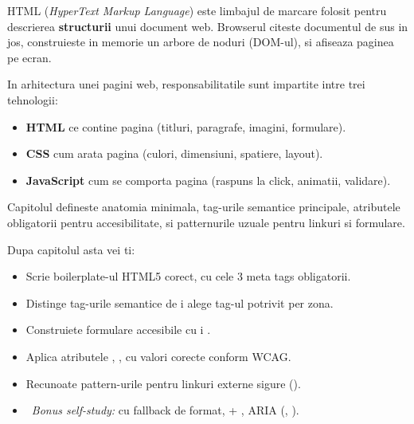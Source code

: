 \clearpage
{}
\setcounter{section}{0}
{}

HTML (\emph{HyperText Markup Language}) este limbajul de marcare folosit pentru descrierea \textbf{structurii} unui document web. Browserul citeste documentul de sus in jos, construieste in memorie un arbore de noduri (DOM-ul), si afiseaza paginea pe ecran.

In arhitectura unei pagini web, responsabilitatile sunt impartite intre trei tehnologii:

\begin{itemize}[itemsep=0pt]
  \item \textbf{HTML} \textendash{} ce contine pagina (titluri, paragrafe, imagini, formulare).
  \item \textbf{CSS} \textendash{} cum arata pagina (culori, dimensiuni, spatiere, layout).
  \item \textbf{JavaScript} \textendash{} cum se comporta pagina (raspuns la click, animatii, validare).
\end{itemize}

Capitolul defineste anatomia minimala, tag-urile semantice principale, atributele obligatorii pentru accesibilitate, si patternurile uzuale pentru linkuri si formulare.

\bigskip

\begin{outcomes}
Dupa capitolul asta vei ti:
\begin{itemize}[itemsep=1pt]
  \item Scrie boilerplate-ul HTML5 corect, cu cele 3 meta tags obligatorii.
  \item Distinge tag-urile semantice de  i alege tag-ul potrivit per zona.
  \item Construiete formulare accesibile cu  i .
  \item Aplica atributele , ,  cu valori corecte conform WCAG.
  \item Recunoate pattern-urile pentru linkuri externe sigure ().
  \item \faRocket\ \emph{Bonus self-study:}  cu fallback de format,  + , ARIA (, ).
\end{itemize}
\end{outcomes}

